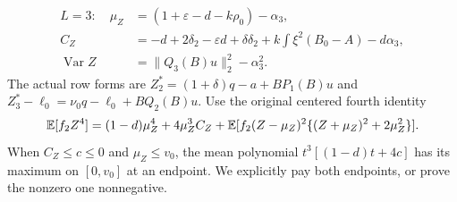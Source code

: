 \begin{equation}\tag{L77.1.9}\label{eq:L77:threemoments}
\begin{aligned}
L=3:\quad\mu_Z&=(1+\varepsilon-d-k\rho_0)-\alpha_3,\\
C_Z&=-d+2\delta_2-\varepsilon d+\delta\delta_2
+k\int\xi^2(B_0-A)-d\alpha_3,\\
\operatorname{Var}Z&=\|Q_3(B)u\|_2^2-\alpha_3^2.
\end{aligned}
\end{equation}
The actual row forms are
$Z_2^*=(1+\delta)q-a+BP_1(B)u$ and
$Z_3^*-\ell_0=\nu_0q-\ell_0+BQ_2(B)u$.
Use the original centered fourth identity
\[
\mathbb E[f_2Z^4]=(1-d)\mu_Z^4+4\mu_Z^3C_Z
+\mathbb E[f_2(Z-\mu_Z)^2\{(Z+\mu_Z)^2+2\mu_Z^2\}].
\]
When $C_Z\le c\le0$ and $\mu_Z\le v_0$, the mean polynomial
$t^3[(1-d)t+4c]$ has its maximum on $[0,v_0]$ at an endpoint.
We explicitly pay both endpoints, or prove the nonzero one nonnegative.

